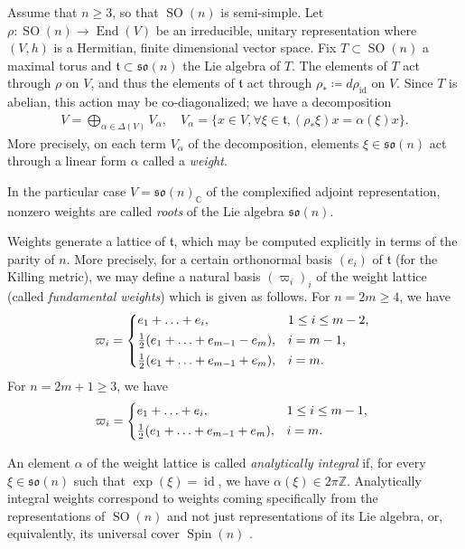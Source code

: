 \documentclass[12pt]{amsart}
\numberwithin{numbering}{section}
\theoremstyle{plain}
\theoremstyle{definition}
\theoremstyle{remark}
\numberwithin{equation}{section}
\DeclareMathOperator{\identity}{id}
\DeclareMathOperator{\End}{End}
\DeclareMathOperator{\SO}{SO}
\DeclareMathOperator{\Spin}{Spin}
\newcommand{\Z}{\mathbb{Z}}
\newcommand{\C}{\mathbb{C}}
\newcommand{\frk}[1]{\mathfrak{#1}}
\begin{document}
\medskip 

Assume that $n \geq 3$, so that $\SO(n)$ is semi-simple. Let $\rho: \SO(n) \to \End(V)$ be an irreducible, unitary representation where $(V, h)$ is a Hermitian, finite dimensional vector space. Fix $T \subset \SO(n)$ a maximal torus and $\frk{t} \subset \frk{so}(n)$ the Lie algebra of $T$. The elements of $T$ act through $\rho$ on $V$, and thus the elements of $\frk{t}$ act through $\rho_* \coloneq d\rho_{\identity}$ on $V$. Since $T$ is abelian, this action may be co-diagonalized; we have a decomposition
\begin{align*}
V = \bigoplus_{\alpha \in \Delta(V)} V_\alpha, \quad V_\alpha = \{ x \in V, \forall \xi \in \frk{t}, (\rho_* \xi) x = \alpha(\xi) x \}.
\end{align*}
More precisely, on each term $V_\alpha$ of the decomposition, elements $\xi \in \frk{so}(n)$ act through a linear form $\alpha$ called a \emph{weight}.

In the particular case $V = \frk{so}(n)_\C$ of the complexified adjoint representation, nonzero weights are called \emph{roots} of the Lie algebra $\frk{so}(n)$. 

\medskip 

Weights generate a lattice of $\frk{t}$, which may be computed explicitly in terms of the parity of $n$. More precisely, for a certain orthonormal basis $(e_i)$ of $\frk{t}$ (for the Killing metric), we may define a natural basis $(\varpi_i)_i$ of the weight lattice (called \emph{fundamental weights}) which is given as follows. For $n = 2m \geq 4$, we have 
\begin{equation*} \varpi_i = \begin{cases*}
e_1 + \ldots + e_i, & $1 \leq i \leq m-2$, \\
\frac{1}{2} (e_1 + \ldots + e_{m-1} - e_m), & $i = m - 1$, \\ 
\frac{1}{2} (e_1 + \ldots + e_{m-1} + e_m), & $i = m$.
\end{cases*} 
\end{equation*}
For $n = 2m + 1 \geq 3$, we have 
\begin{align*}
\varpi_i = \begin{cases*}
e_1 + \ldots + e_i, & $1 \leq i \leq m - 1$, \\ 
\frac{1}{2} (e_1 + \ldots + e_{m-1} + e_m), & $i = m$.
\end{cases*}
\end{align*}

An element $\alpha$ of the weight lattice is called \emph{analytically integral} if, for every $\xi \in \frk{so}(n)$ such that $\exp(\xi) = \identity$, we have $\alpha(\xi) \in 2 \pi \Z$. Analytically integral weights correspond to weights coming specifically from the representations of $\SO(n)$ and not just representations of its Lie algebra, or, equivalently, its universal cover $\Spin(n)$ \cite[Theorem 5.110]{knapp1996lie}.
\end{document}

